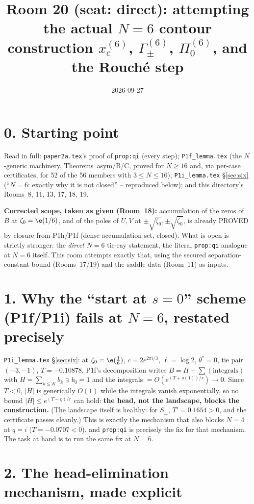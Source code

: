 \documentclass[11pt]{article}
\title{Room 20 (seat: direct): attempting the actual $N=6$ contour construction
$x_c^{(6)}$, $\Gamma_\pm^{(6)}$, $\Pi_0^{(6)}$, and the Rouch\'e step}
\date{2026-09-27}
\begin{document}
\maketitle

\section*{0. Starting point}

Read in full: \texttt{paper2a.tex}'s proof of \texttt{prop:qi} (every step); \texttt{P1f\_lemma.tex}
(the $N$-generic machinery, Theorems~asym/B/C, proved for $N\ge16$ and, via per-case certificates,
for 52 of the 56 members with $3\le N\le16$); \texttt{P1i\_lemma.tex} \S\ref{sec:six} (``$N=6$: exactly
why it is not closed'' -- reproduced below); and this directory's Rooms~8, 11, 13, 17, 18, 19.

\textbf{Corrected scope, taken as given (Room~18):} accumulation of the zeros of $B$ at $\zeta_0=\e(1/6)$,
and of the poles of $U,V$ at $\pm\sqrt{\zeta_0},\pm\sqrt{\bar\zeta_0}$, is already PROVED by closure from
P1h/P1f (dense accumulation set, closed). What is open is strictly stronger: the \emph{direct} $N=6$
tie-ray statement, the literal \texttt{prop:qi} analogue at $N=6$ itself. This room attempts exactly
that, using the secured separation-constant bound (Rooms~17/19) and the saddle data (Room~11) as inputs.

\section*{1. Why the ``start at $s=0$'' scheme (P1f/P1i) fails at $N=6$, restated precisely}

\texttt{P1i\_lemma.tex} \S\ref{sec:six}: at $\zeta_0=\e(\frac16)$, $c=2e^{2\pi i/3}$, $\ell=\log2$,
$\theta^*=0$, tie pair $(-3,-1)$, $T=-0.10878$. P1f's decomposition writes $B=H+\sum(\text{integrals})$
with $H=\sum_{k\le K}b_k\ni b_0=1$ and the integrals $=O(e^{(T+o(1))/r})\to0$. Since $T<0$, $|H|$ is
generically $O(1)$ while the integrals vanish exponentially, so no bound $|H|\le e^{(T-\eta)/r}$ can hold:
\textbf{the head, not the landscape, blocks the construction.} (The landscape itself is healthy: for
$S_\pm$, $T'=0.1654>0$, and the certificate passes cleanly.) This is exactly the mechanism that also
blocks $N=4$ at $q=i$ ($T=-0.0707<0$), and \texttt{prop:qi} is precisely the fix for that mechanism.
The task at hand is to run the same fix at $N=6$.

\section*{2. The head-elimination mechanism, made explicit}
\end{document}
